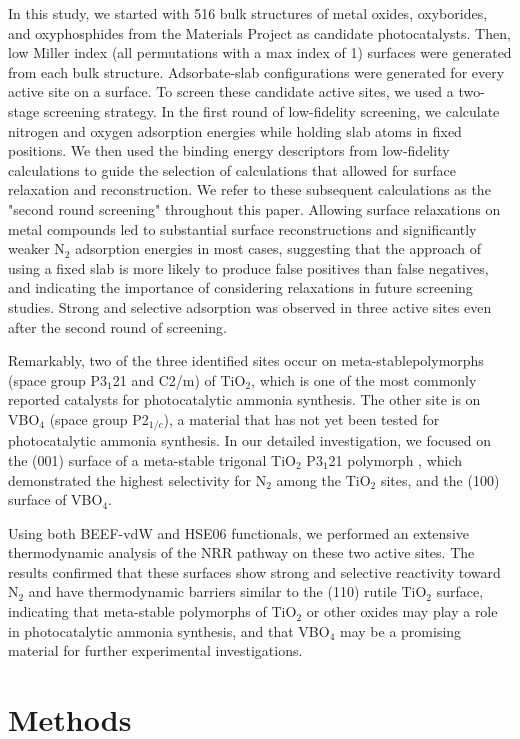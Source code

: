 In this study, we started with 516 bulk structures of metal oxides, oxyborides, and oxyphosphides from the Materials Project \cite{Jain2013} as candidate photocatalysts. Then, low Miller index (all permutations with a max index of 1) surfaces were generated from each bulk structure. Adsorbate-slab configurations were generated for every active site on a surface. To screen these candidate active sites, we used a two-stage screening strategy. In the first round of low-fidelity screening, we calculate nitrogen and oxygen adsorption energies while holding slab atoms in fixed positions. We then used the binding energy descriptors from low-fidelity calculations to guide the selection of calculations that allowed for surface relaxation and reconstruction. We refer to these subsequent calculations as the "second round screening" throughout this paper. Allowing surface relaxations on metal compounds led to substantial surface reconstructions and significantly weaker N$_2$ adsorption energies in most cases, suggesting that the approach of using a fixed slab is more likely to produce false positives than false negatives, and indicating the importance of considering relaxations in future screening studies. Strong and selective  adsorption was observed in three active sites even after the second round of screening. 

Remarkably, two of the three identified sites occur on meta-stablepolymorphs (space group P3$_1$21 and C2/m) of TiO$_2$, which is one of the most commonly reported catalysts for photocatalytic ammonia synthesis. The other site is on VBO$_4$ (space group P2$_{1/c}$), a material that has not yet been tested for photocatalytic ammonia synthesis. In our detailed investigation, we focused on the (001) surface of a meta-stable trigonal TiO$_2$ P3$_1$21 polymorph \cite{tio2_152}, which demonstrated the highest selectivity for N$_2$ among the TiO$_2$ sites, and the (100) surface of VBO$_4$. 

Using both BEEF-vdW and HSE06 functionals, we performed an extensive thermodynamic analysis of the NRR pathway on these two active sites. The results confirmed that these surfaces show strong and selective reactivity toward N$_2$ and have thermodynamic barriers similar to the (110) rutile TiO$_2$ surface, indicating that meta-stable polymorphs of TiO$_2$ or other oxides may play a role in photocatalytic ammonia synthesis, and that VBO$_4$ may be a promising material for further experimental investigations.


\section*{Methods}
